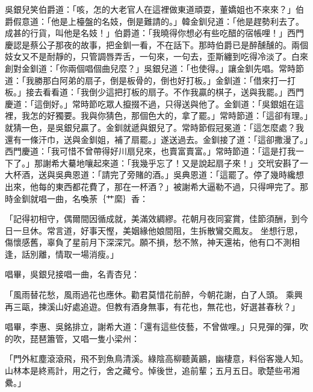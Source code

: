 吳銀兒笑伯爵道：「咳，怎的大老官人在這裡做東道頑耍，董嬌姐也不來來？」伯爵假意道：「他是上檯盤的名妓，倒是難請的。」韓金釧兒道：「他是趕勢利去了。成甚的行貨，叫他是名妓！」伯爵道：「我曉得你想必有些吃醋的宿帳哩！」西門慶認是蔡公子那夜的故事，把金釧一看，不在話下。那時伯爵已是醉醺醺的。兩個妓女又不是耐靜的，只管調唇弄舌，一句來，一句去，歪斯纏到吃得冷淡了。白來創對金釧道：「你兩個唱個曲兒麼？」吳銀兒道：「也使得。」讓金釧先唱。常時節道：「我勝那白阿弟的扇子，倒是板骨的，倒也好打板。」金釧道：「借來打一打板。」接去看看道：「我倒少這把打板的扇子。不作我贏的棋子，送與我罷。」西門慶道：「這倒好。」常時節吃眾人攛掇不過，只得送與他了。金釧道：「吳銀姐在這裡，我怎的好獨要。我與你猜色，那個色大的，拿了罷。」常時節道：「這卻有理。」就猜一色，是吳銀兒贏了。金釧就遞與銀兒了。常時節假冠冕道：「這怎麼處？我還有一條汗巾，送與金釧姐，補了扇罷。」遂送過去。金釧接了道：「這卻撒漫了。」西門慶道：「我可惜不曾帶得好川扇兒來，也賣富賣富。」常時節道：「這是打我一下了。」那謝希大驀地嚷起來道：「我幾乎忘了！又是說起扇子來！」交玳安斟了一大杯酒，送與吳典恩道：「請完了旁賭的酒。」吳典恩道：「這罷了。停了幾時纔想出來，他每的東西都花費了，那在一杯酒？」被謝希大逼勒不過，只得呷完了。那時金釧就唱一曲，名喚荼｛艹縻｝香：

「記得初相守，偶爾間因循成就，美滿效綢繆。花朝月夜同宴賞，佳節須酬，到今日一旦休。常言道，好事天慳，美姻緣他娘間阻，生拆散鸞交鳳友。  坐想行思，傷懷感舊，辜負了星前月下深深咒。願不損，愁不煞，神天還祐，他有口不測相逢，話別離，情取一場消瘦。」

唱畢，吳銀兒接唱一曲，名青杏兒：

「風雨替花愁，風雨過花也應休。勸君莫惜花前醉，今朝花謝，白了人頭。  乘興再三甌，揀溪山好處追遊。但教有酒身無事，有花也，無花也，好選甚春秋？」

唱畢，李惠、吳銘排立，謝希大道：「還有這些伎藝，不曾做哩。」只見彈的彈，吹的吹，琵琶簫管，又唱一隻小梁州：

「門外紅塵滾滾飛，飛不到魚鳥清溪。綠陰高柳聽黃鸝，幽棲意，料俗客幾人知。山林本是終焉計，用之行，舍之藏兮。悼後世，追前輩；五月五日。歌楚些弔湘纍。」

